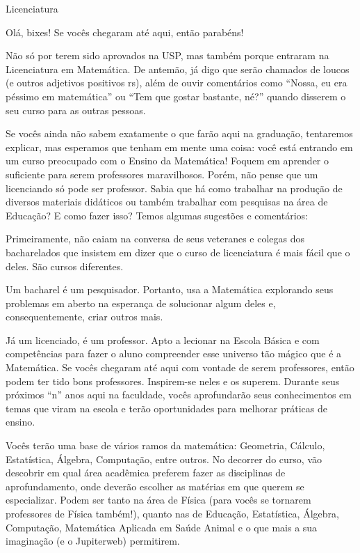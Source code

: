 \begin{subsecao}{Licenciatura}

Olá, bixes! Se vocês chegaram até aqui, então parabéns!

Não só por terem sido aprovados na USP, mas também porque entraram na
Licenciatura em Matemática. De antemão, já digo que serão chamados de
loucos (e outros adjetivos positivos rs), além de ouvir comentários como
``Nossa, eu era péssimo em matemática'' ou ``Tem que gostar bastante,
né?'' quando disserem o seu curso para as outras pessoas.

Se vocês ainda não sabem exatamente o que farão aqui na graduação, tentaremos
explicar, mas esperamos que tenham em mente uma coisa: você está entrando em um
curso preocupado com o Ensino da Matemática! Foquem em aprender o suficiente para 
serem professores maravilhosos. Porém, não pense que um licenciando só pode ser professor.
Sabia que há como trabalhar na produção de diversos materiais didáticos ou também trabalhar
com pesquisas na área de Educação? E como fazer isso?  Temos algumas sugestões e comentários:

Primeiramente, não caiam na conversa de seus veteranes e colegas dos bacharelados
que insistem em dizer que o curso de licenciatura é mais fácil que o deles. São
cursos diferentes.

Um bacharel é um pesquisador. Portanto, usa a Matemática explorando seus
problemas em aberto na esperança de solucionar algum deles e, consequentemente,
criar outros mais.

Já um licenciado, é um professor. Apto a lecionar na Escola Básica e com
competências para fazer o aluno compreender esse universo tão mágico que é a
Matemática. Se vocês chegaram até aqui com vontade de serem professores, então
podem ter tido bons professores. Inspirem-se neles e os superem. Durante seus 
próximos ``n'' anos aqui na faculdade, vocês aprofundarão seus conhecimentos em 
temas que viram na escola e terão oportunidades para melhorar práticas de ensino.
 

Vocês terão uma base de vários ramos da matemática: Geometria, Cálculo,
Estatística, Álgebra, Computação, entre outros. No decorrer do curso, vão
descobrir em qual área acadêmica preferem fazer as disciplinas de
aprofundamento, onde deverão escolher as matérias em que querem se especializar.
Podem ser tanto na área de Física (para vocês se tornarem professores de Física
também!), quanto nas de Educação, Estatística, Álgebra, Computação, Matemática
Aplicada em Saúde Animal e o que mais a sua imaginação (e o Jupiterweb) permitirem.


\end{subsecao}
